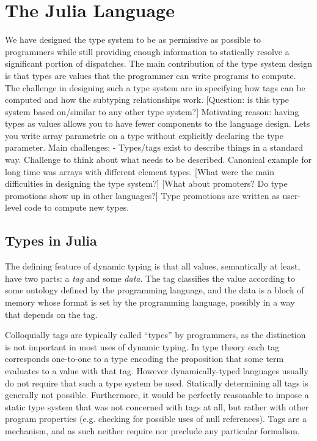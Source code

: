 \section{The Julia Language}

We have designed the type system to be as permissive as possible to programmers while still providing enough information to statically resolve a significant portion of dispatches. The main contribution of the type system design is that types are values that the programmer can write programs to compute. The challenge in designing such a type system are in specifying how tags can be computed and how the subtyping relationships work. [Question: is this type system based on/similar to any other type system?]
Motivating reason: having types as values allows you to have fewer components to the language design. Lets you write array parametric on a type without explicitly declaring the type parameter.
Main challenges:
- Types/tags exist to describe things in a standard way. Challenge to think about what needs to be described. Canonical example for long time was arrays with different element types.
[What were the main difficulties in designing the type system?]
[What about promoters? Do type promotions show up in other languages?]
Type promotions are written as user-level code to compute new types.

\subsection{Types in Julia}
The defining feature of dynamic typing is that all values, semantically at least, have
two parts: a \emph{tag} and some \emph{data}. The tag classifies the value according to
some ontology defined by the programming language, and the data is a block of memory
whose format is set by the programming language, possibly in a way that depends on the
tag.

Colloquially tags are typically called ``types'' by programmers, as the distinction
is not important in most uses of dynamic typing. In type theory each tag corresponds
one-to-one to a type encoding the proposition that some term evaluates to a value
with that tag. However dynamically-typed languages usually do not require that such
a type system be used. Statically determining all tags is generally not possible.
Furthermore, it would be perfectly reasonable to impose a static type system that
was not concerned with tags at all, but rather with other program properties
(e.g. checking for possible uses of null references). Tags are a mechanism, and as
such neither require nor preclude any particular formalism.

